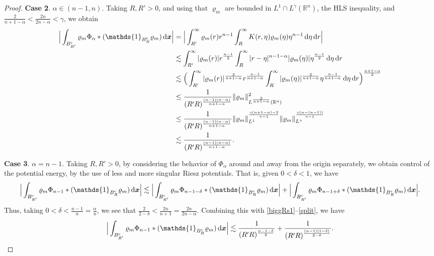 \documentclass[reqno,11pt]{amsart}
\numberwithin{equation}{section}
\theoremstyle{definition}
\def\dd{{\, \rm d}}
\begin{document}
\begin{proof}
  \smallskip
  \noindent
  {\bf Case 2}. $\alpha \in (n-1,n)$.
  Taking $R,R'>0$, and using that $\varrho_m$ are bounded in $L^1 \cap L^\gamma (\mathbb{R}^n)$, the HLS inequality, and $\frac{2}{n + 1 - \alpha} < \frac{2n}{2n - \alpha} < \gamma$, we obtain
    \begin{align}\label{biggRs2}
      \begin{split}
 \Big| \int_{B_{R'}^{\rm c}} \varrho_m \Phi_\alpha * (\mathds{1}_{B_R^{\rm c}}\varrho_m) \dd \boldsymbol{x} \Big|
 & = \Big| \int^\infty_{R'} \varrho_m(r) r^{n-1} \int^\infty_R K(r,\eta) \varrho_m(\eta) \eta^{n-1} \dd \eta \dd r \Big| \\
 & \lesssim \int^\infty_{R'} |\varrho_m(r)| r^{\frac{n-1}{2}} \int^\infty_R |r-\eta|^{n-1-\alpha} |\varrho_m(\eta)| \eta^{\frac{n-1}{2}} \dd \eta \dd r \\
 & \lesssim \Big( \int^\infty_{R'} |\varrho_m(r)|^\frac{2}{n + 1 - \alpha} r^{\frac{n-1}{n + 1 - \alpha}} \int^\infty_R |\varrho_m(\eta)|^\frac{2}{n + 1 - \alpha} \eta^{\frac{n-1}{n + 1 - \alpha}} \dd \eta \dd r \Big)^\frac{n + 1 - \alpha}{2} \\
 & \leq \frac{1}{(R'R)^\frac{(n-1)(n-\alpha)}{n + 1 - \alpha}} \|\varrho_m\|_{L^\frac{2}{n + 1 - \alpha}(\mathbb{R}^n)}^2 \\
 & \leq \frac{1}{(R'R)^\frac{(n-1)(n-\alpha)}{n + 1 - \alpha}} \|\varrho_m\|_{L^1}^\frac{\gamma(n + 1 - \alpha) - 2}{\gamma - 1} \|\varrho_m\|_{L^\gamma}^\frac{\gamma(\alpha - (n-1))}{\gamma - 1} \\
 & \lesssim \frac{1}{(R'R)^\frac{(n-1)(n-\alpha)}{n + 1 - \alpha}}.
 \end{split}
    \end{align}

\smallskip
\noindent
{\bf Case 3}. $\alpha = n-1$. 
Taking $R,R'>0$, by considering the behavior of $\Phi_\alpha$ around and away from 
the origin separately, we obtain control of the potential energy, 
by the use of less and more singular Riesz potentials. 
That is, given $0 < \delta < 1$, we have
 \begin{equation}\label{split}
 \Big| \int_{B_{R'}^{\rm c}} \varrho_m \Phi_{n-1} * (\mathds{1}_{B_R^{\rm c}}\varrho_m) \dd \boldsymbol{x} \Big| \lesssim \Big| \int_{B_{R'}^{\rm c}} \varrho_m \Phi_{n-1- \delta} * (\mathds{1}_{B_R^{\rm c}}\varrho_m) \dd \boldsymbol{x} \Big| 
  + \Big| \int_{B_{R'}^{\rm c}} \varrho_m \Phi_{n - 1 + \delta} * (\mathds{1}_{B_R^{\rm c}}\varrho_m) 
 \dd \boldsymbol{x} \Big|.
 \end{equation}
Thus, taking $0 < \delta < \frac{n-1}{n} = \frac{\alpha}{n}$, 
we see that $\frac{2}{2- \delta} < \frac{2n}{n + 1} = \frac{2n}{2n - \alpha}$. 
Combining this with \eqref{biggRs1}--\eqref{split}, we have
 \begin{equation}\label{biggRs3}
  \Big| \int_{B_{R'}^{\rm c}} \varrho_m \Phi_{n-1} * (\mathds{1}_{B_R^{\rm c}}\varrho_m) \dd \boldsymbol{x} \Big| \lesssim \frac{1}{(R'R)^\frac{n - 1 - \delta}{2}} + \frac{1}{(R'R)^\frac{(n-1)(1-\delta)}{2 - \delta}}.
  \end{equation}
   

\end{proof}
\end{document}
